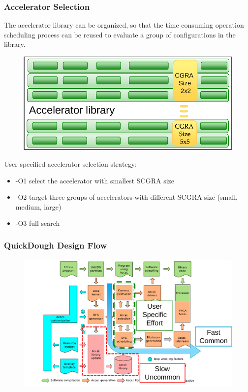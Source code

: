 \documentclass[accentcolor=tud1a,colorbacktitle,inverttitle,landscape,german,presentation,t]{tudbeamer}
\begin{document}
\begin{frame}
\frametitle{Accelerator Selection}
\vspace{-0.8em}
The accelerator library can be organized, so that the time consuming operation scheduling process can be reused to evaluate a group of configurations in the library. 

  \begin{figure}
     \includegraphics[width=.65\linewidth]{accel-sel3}
  \end{figure}
User specified accelerator selection strategy:
\begin{itemize}
   \item -O1 select the accelerator with smallest SCGRA size
   \item -O2 target three groups of accelerators with different SCGRA size (small, medium, large)
   \item -O3 full search
\end{itemize}
\end{frame}

\begin{frame}
  \frametitle{QuickDough Design Flow}
  \begin{figure}
     \includegraphics[width=.95\linewidth]{qd-flow4}
  \end{figure}
\end{frame}
\end{document}
